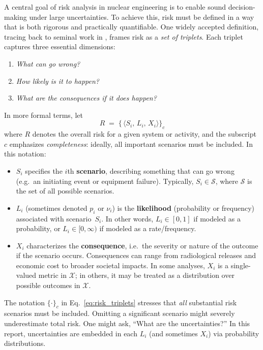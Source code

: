 A central goal of risk analysis in nuclear engineering is to enable sound decision-making under large uncertainties. To achieve this, risk must be defined in a way that is both rigorous and practically quantifiable. One widely accepted definition, tracing back to seminal work in \cite{kaplan_quantitative_1981, garrick_quantifying_2008}, frames risk as a \emph{set of triplets}. Each triplet captures three essential dimensions:

\begin{enumerate}
  \item \textit{What can go wrong?}
  \item \textit{How likely is it to happen?}
  \item \textit{What are the consequences if it does happen?}
\end{enumerate}

In more formal terms, let
\begin{equation}
\label{eq:risk_triplets}
    R \;=\;
    \bigl\{\,
        \langle
            S_i,\,
            L_i,\,
            X_i
        \rangle
    \bigr\}_{c}
\end{equation}
where \(R\) denotes the overall risk for a given system or activity, and the subscript \(c\) emphasizes \emph{completeness}: ideally, all important scenarios must be included. In this notation:
\begin{itemize}
    \item \(S_i\) specifies the \(i\)th \textbf{scenario}, describing something that can go wrong (e.g.\ an initiating event or equipment failure).  Typically, \(S_i \in \mathcal{S}\), where \(\mathcal{S}\) is the set of all possible scenarios.
    \item \(L_i\) (sometimes denoted \(p_i\) or \(\nu_i\)) is the \textbf{likelihood} (probability or frequency) associated with scenario~\(S_i\).  In other words, \(L_i\in [0,1]\) if modeled as a probability, or \(L_i\in [0,\infty)\) if modeled as a rate/frequency.
    \item \(X_i\) characterizes the \textbf{consequence}, i.e.\ the severity or nature of the outcome if the scenario occurs. Consequences can range from radiological releases and economic cost to broader societal impacts. In some analyses, \(X_i\) is a single-valued metric in \(\mathcal{X}\); in others, it may be treated as a distribution over possible outcomes in \(\mathcal{X}\).
\end{itemize}

The notation \(\{\cdot\}_{c}\) in Eq.~\eqref{eq:risk_triplets} stresses that \emph{all} substantial risk scenarios must be included. Omitting a significant scenario might severely underestimate total risk. One might ask, ``What are the uncertainties?'' In this report, uncertainties are embedded in each \(L_i\) (and sometimes \(X_i\)) via probability distributions.

